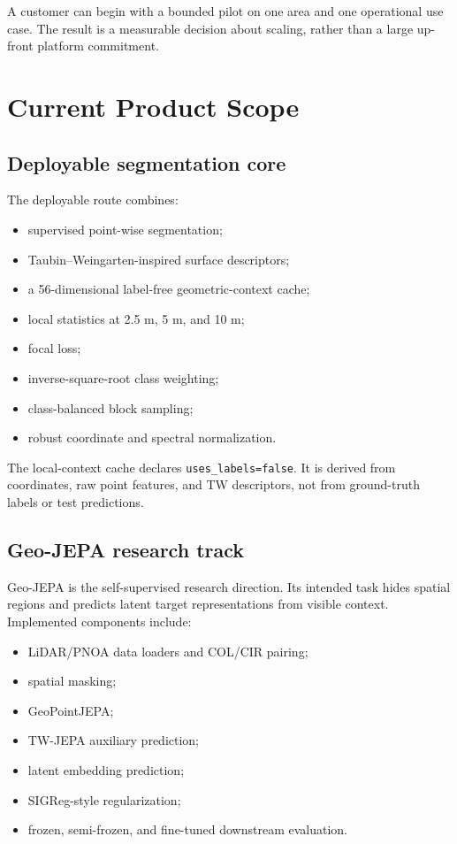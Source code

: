 \documentclass[11pt,a4paper]{article}
\begin{document}
A customer can begin with a bounded pilot on one area and one operational use case. The result is a measurable decision about scaling, rather than a large up-front platform commitment.

\section{Current Product Scope}

\subsection{Deployable segmentation core}

The deployable route combines:

\begin{itemize}
  \item supervised point-wise segmentation;
  \item Taubin--Weingarten-inspired surface descriptors;
  \item a 56-dimensional label-free geometric-context cache;
  \item local statistics at 2.5 m, 5 m, and 10 m;
  \item focal loss;
  \item inverse-square-root class weighting;
  \item class-balanced block sampling;
  \item robust coordinate and spectral normalization.
\end{itemize}

The local-context cache declares \texttt{uses\_labels=false}. It is derived from coordinates, raw point features, and TW descriptors, not from ground-truth labels or test predictions.

\subsection{Geo-JEPA research track}

Geo-JEPA is the self-supervised research direction. Its intended task hides spatial regions and predicts latent target representations from visible context. Implemented components include:

\begin{itemize}
  \item LiDAR/PNOA data loaders and COL/CIR pairing;
  \item spatial masking;
  \item GeoPointJEPA;
  \item TW-JEPA auxiliary prediction;
  \item latent embedding prediction;
  \item SIGReg-style regularization;
  \item frozen, semi-frozen, and fine-tuned downstream evaluation.
\end{itemize}
\end{document}
